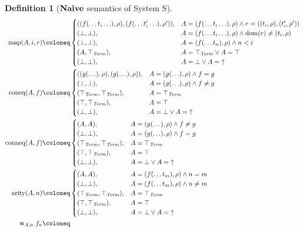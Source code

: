 \documentclass{article}
\newtheorem{definition}[theorem]{Definition}
\newcommand{\fail}{\ensuremath \text{$\uparrow$}}
\newcommand{\dom}{\ensuremath \operatorname{dom}}
\newcommand{\Term}{\ensuremath \mathit{Term}}
\newcommand{\Cat}[1]{\ensuremath \mathbf{#1}}
\newcommand{\Naive}{\ensuremath \Cat{Naive}}
\newcommand{\map}{\ensuremath \operatorname{map}}
\newcommand{\arity}{\ensuremath \operatorname{arity}}
\newcommand{\coneq}{\ensuremath \operatorname{coneq}}
\newcommand{\conneq}{\ensuremath \operatorname{conneq}}
\newcommand{\ttop}{\ensuremath \top_{\Term}}
\newcommand{\witharity}{\ensuremath \Join}
\begin{document}
\begin{definition}[$\Naive$ semantics of System S]
\begin{align*}
    \map(A,i,r) &\coloneq
                  \begin{cases}
                    ((f(\ldots t_i \ldots),\rho),(f(\ldots t_i' \ldots),\rho')), & A = (f(\ldots t_i \ldots),\rho) \land r = ((t_i,\rho),(t_i',\rho')) \\
                    (\bot,\bot), & A = (f(\ldots t_i \ldots),\rho) \land \dom(r) \neq (t_i,\rho) \\
                    (\bot,\bot), & A = (f(\ldots t_n),\rho) \land n < i \\
                    (A,\ttop), & A = \ttop \lor A = \top \\
                    (\bot,\bot), & A = \bot \lor A = \fail \\
                  \end{cases} \\
    \coneq(A,f) &\coloneq
                  \begin{cases}
                    ((g(\ldots),\rho),(g(\ldots),\rho)), & A = (g(\ldots),\rho) \land f = g \\
                    (\bot,\bot), & A = (g(\ldots),\rho) \land f \neq g \\
                    (\ttop,\ttop), & A = \ttop \\
                    (\top,\ttop), & A = \top \\
                    (\bot,\bot), & A = \bot \lor A = \fail \\
                  \end{cases} \\
    \conneq(A,f) &\coloneq
                   \begin{cases}
                     (A,A), & A = (g(\ldots),\rho) \land f \neq g \\
                     (\bot,\bot), & A = (g(\ldots),\rho) \land f = g \\
                     (\ttop,\ttop), & A = \ttop \\
                     (\top,\ttop), & A = \top \\
                     (\bot,\bot), & A = \bot \lor A = \fail \\
                   \end{cases} \\
    \arity(A,n) &\coloneq
                  \begin{cases}
                    (A,A), & A = (f(\ldots t_m),\rho) \land n = m \\
                    (\bot,\bot), & A = (f(\ldots t_m),\rho) \land n \neq m \\
                    (\ttop,\ttop), & A = \ttop \\
                    (\top,\ttop), & A = \top \\
                    (\bot,\bot), & A = \bot \lor A = \fail \\
                  \end{cases} \\
    \witharity_{A,n} f_n &\coloneq 
  \end{align*}
  

\end{definition}
\end{document}
